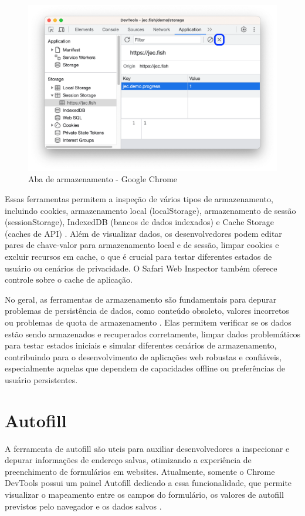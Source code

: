 \begin{figure}[h!]
    \centering
    \includegraphics[width=0.7\linewidth]{assets/tools/chrome-storage.png}
    \caption{Aba de armazenamento - Google Chrome }
    \label{fig:enter-label}
\end{figure}

Essas ferramentas permitem a inspeção de vários tipos de armazenamento, incluindo cookies, armazenamento local (localStorage), armazenamento de sessão (sessionStorage), IndexedDB (bancos de dados indexados) e Cache Storage (caches de API) \cite{edge}.
Além de visualizar dados, os desenvolvedores podem editar pares de chave-valor para armazenamento local e de sessão, limpar cookies e excluir recursos em cache, o que é crucial para testar diferentes estados de usuário ou cenários de privacidade. O Safari Web Inspector também oferece controle sobre o cache de aplicação.

No geral, as ferramentas de armazenamento são fundamentais para depurar problemas de persistência de dados, como conteúdo obsoleto, valores incorretos ou problemas de quota de armazenamento \cite{apple}. Elas permitem verificar se os dados estão sendo armazenados e recuperados corretamente, limpar dados problemáticos para testar estados iniciais e simular diferentes cenários de armazenamento, contribuindo para o desenvolvimento de aplicações web robustas e confiáveis, especialmente aquelas que dependem de capacidades offline ou preferências de usuário persistentes.

\section{Autofill}
A ferramenta de autofill são uteis para auxiliar desenvolvedores a inspecionar e depurar informações de endereço salvas, otimizando a experiência de preenchimento de formulários em websites. Atualmente, somente o Chrome DevTools possui um painel Autofill dedicado a essa funcionalidade, que permite visualizar o mapeamento entre os campos do formulário, os valores de autofill previstos pelo navegador e os dados salvos \cite{chrome}.

